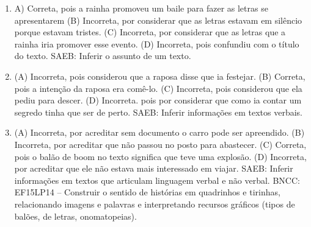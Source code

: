 \begin{enumerate}
\item
A) Correta, pois a rainha promoveu um baile para fazer as letras se
apresentarem
(B) Incorreta, por considerar que as letras estavam em silêncio porque
estavam tristes.
(C) Incorreta, por considerar que as letras que a rainha iria promover
esse evento.
(D) Incorreta, pois confundiu com o título do texto.
SAEB: Inferir o assunto de um texto.

\item
(A) Incorreta, pois considerou que a raposa disse que ia festejar.
(B) Correta, pois a intenção da raposa era comê-lo.
(C) Incorreta, pois considerou que ela pediu para descer.
(D) Incorreta. pois por considerar que como ia contar um segredo tinha
que ser de perto.
SAEB: Inferir informações em textos verbais.

\item
(A) Incorreta, por acreditar sem documento o carro pode ser apreendido.
(B) Incorreta, por acreditar que não passou no posto para abastecer.
(C) Correta, pois o balão de boom no texto significa que teve uma explosão.
(D) Incorreta, por acreditar que ele não estava mais interessado em viajar.
SAEB: Inferir informações em textos que articulam linguagem verbal e não verbal.
BNCC: EF15LP14 -- Construir o sentido de histórias em quadrinhos e tirinhas, relacionando imagens e palavras e interpretando recursos gráficos (tipos de balões, de letras, onomatopeias).
\end{enumerate}